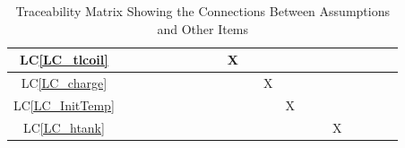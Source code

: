 \documentclass[12pt]{article}
\newcommand{\lcref}[1]{LC\ref{#1}}
\begin{document}
{\begin{landscape}
\begin{table}[h!]
\begin{tabular}{|c|c|c|c|c|c|c|c|c|c|c|c|c|c|c|c|c|c|c|c|}
                \lcref{LC_tlcoil}   &                            &                 &                &               &                        &                  &                    &                & X               &                   &                 &                   &                     &                  &                &                   &               &                    &                   \\ \hline
                \lcref{LC_charge}   &                            &                 &                &               &                        &                  &                    &                &                 &                   & X               &                   &                     &                  &                &                   &               &                    &                   \\ \hline
                \lcref{LC_InitTemp} &                            &                 &                &               &                        &                  &                    &                &                 &                   &                 & X                 &                     &                  &                &                   &               &                    &                   \\ \hline
                \lcref{LC_htank}    &                            &                 &                &               &                        &                  &                    &                &                 &                   &                 &                   &                     &                  & X              &                   &               &                    &                   \\
                \hline
            \end{tabular}
            \caption{Traceability Matrix Showing the Connections Between Assumptions and Other Items}
            \label{Table:A_trace}
        \end{table}
    \end{landscape}
}
\end{document}
